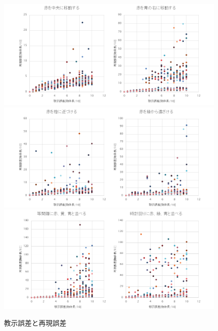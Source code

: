 	\begin{figure}
		\begin{center}
			\includegraphics[width=15.5cm]{chart6.png} \\ %
			\includegraphics[width=15.5cm]{chart7.png} \\ %
			\includegraphics[width=15.5cm]{chart8.png} \\ %
			\caption{教示誤差と再現誤差}
			\label{figure:errors}
		\end{center}
	\end{figure}



